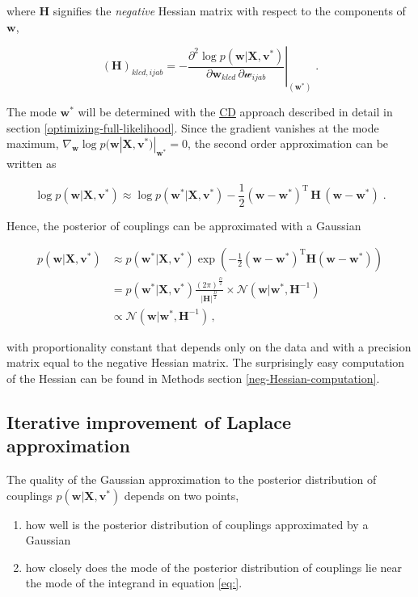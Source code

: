 \documentclass[12pt,a4paper,twoside]{book}
\providecommand{\tightlist}{%
  \setlength{\itemsep}{0pt}\setlength{\parskip}{0pt}}
\newcommand{\Gauss}{\mathcal{N}}
\renewcommand{\H}{\mathbf{H}}
\renewcommand{\v}{\mathbf{v}}
\newcommand{\w}{\mathbf{w}}
\newcommand{\wijab}{\mathcal{w}_{ijab}}
\newcommand{\X}{\mathbf{X}}
\theoremstyle{definition}
\theoremstyle{definition}
\theoremstyle{remark}
\begin{document}
where \(\H\) signifies the \emph{negative} Hessian matrix with respect
to the components of \(\w\),

\begin{equation}
    (\H)_{klcd, ijab} = - \left. \frac{\partial^2  \log p(\w | \X , \v^{*})}{\partial \w_{klcd} \, \partial \wijab  } \right|_{(\w^{*})} \; .
\end{equation}

The mode \(\w^*\) will be determined with the
\protect\hyperlink{abbrev}{CD} approach described in detail in section
\ref{optimizing-full-likelihood}. Since the gradient vanishes at the
mode maximum, \(\nabla_\w \log p(\w | \X , \v^*)|_{\w^*} = 0\), the
second order approximation can be written as

\begin{equation}
    \log p(\w | \X , \v^*) {\approx}  \log p(\w^* | \X , \v^*)  - \frac{1}{2} (\w-\w^*)^{\mathrm{T}} \, \H \, (\w-\w^*)  \;.
\end{equation}

Hence, the posterior of couplings can be approximated with a Gaussian

\begin{align}
   p(\w | \X , \v^*) &\approx p(\w^* | \X , \v^*) \exp \left( - \frac{1}{2} (\w-\w^*)^{\mathrm{T}} \H  (\w -\w^*) \right) \nonumber \\
              &= p(\w^* | \X , \v^*) \frac{(2 \pi)^\frac{D}{2}} { |\H|^\frac{D}{2}} \times \Gauss (\w | \w^*, \H^{-1} )  \\
              &\propto  \Gauss (\w | \w^*, \H^{-1}) \,,
\label{eq:reg-lik-gauss-approx}
\end{align}

with proportionality constant that depends only on the data and with a
precision matrix equal to the negative Hessian matrix. The surprisingly
easy computation of the Hessian can be found in Methods section
\ref{neg-Hessian-computation}.

\subsection{Iterative improvement of Laplace
approximation}\label{laplace-approx-improvement}

The quality of the Gaussian approximation to the posterior distribution
of couplings \(p(\w | \X , \v^*)\) depends on two points,

\begin{enumerate}
\def\labelenumi{\arabic{enumi}.}
\tightlist
\item
  how well is the posterior distribution of couplings approximated by a
  Gaussian
\item
  how closely does the mode of the posterior distribution of couplings
  lie near the mode of the integrand in equation \ref{eq:}.
\end{enumerate}
\end{document}
